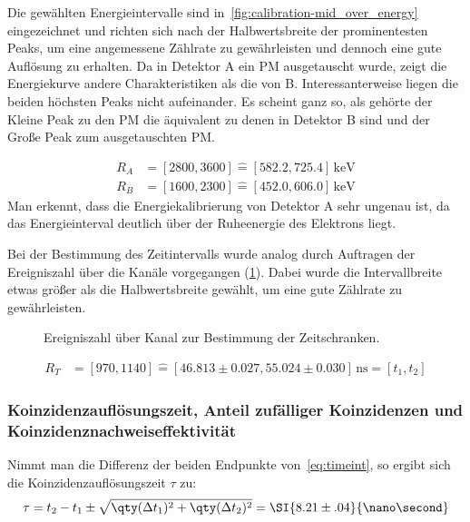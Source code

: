 \documentclass[slug=PET, room=Andreas-Schubert-Bau\,\ 424A, supervisor=Carsten\ Bittrich, coursedate=10.\ 01.\ 2020]{../../Lab_Report_LaTeX/lab_report}
\begin{document}
Die gew\"ahlten Energieintervalle sind
in~\ref{fig:calibration-mid_over_energy} eingezeichnet und richten
sich nach der Halbwertsbreite der prominentesten Peaks, um eine
angemessene Z\"ahlrate zu gew\"ahrleisten und dennoch eine gute
Auflösung zu erhalten. Da in Detektor A ein PM ausgetauscht wurde,
zeigt die Energiekurve andere Charakteristiken als die von
B. Interessanterweise liegen die beiden h\"ochsten Peaks nicht
aufeinander. Es scheint ganz so, als geh\"orte der Kleine Peak zu den
PM die \"aquivalent zu denen in Detektor B sind und der Gro\ss{}e Peak
zum ausgetauschten PM.

\begin{align}
  \label{eq:fenster}
  R_A &= [2800, 3600] \hat{=} [582.2, 725.4]\,\si{\kilo\electronvolt}
  \\
  R_B &= [1600, 2300] \hat{=} [452.0, 606.0]\,\si{\kilo\electronvolt}
\end{align}
Man erkennt, dass die Energiekalibrierung von Detektor A sehr ungenau
ist, da das Energieinterval deutlich \"uber der Ruheenergie des
Elektrons liegt.

Bei der Bestimmung des Zeitintervalls wurde analog durch Auftragen der
Ereigniszahl \"uber die Kan\"ale vorgegangen
(\ref{fig:calibration-time_range}). Dabei wurde die Intervallbreite
etwas gr\"o\ss{}er als die Halbwertsbreite gew\"ahlt, um eine gute
Z\"ahlrate zu gew\"ahrleisten.

\begin{figure}[h]\centering
  
  \caption{Ereigniszahl \"uber Kanal zur Bestimmung der Zeitschranken.}
  \label{fig:calibration-time_range}
\end{figure}

\begin{align}
  \label{eq:timeint}
  R_T &= [970, 1140] \hat{=} [46.813\pm 0.027, 55.024\pm
        0.030]\,\si{\nano\second} = [t_1, t_2]
\end{align}

\subsubsection{Koinzidenzaufl\"osungszeit, Anteil zuf\"alliger Koinzidenzen und Koinzidenznachweiseffektivit\"at}
\label{sec:koaufl}

Nimmt man die Differenz der beiden Endpunkte von~\eqref{eq:timeint}, so
ergibt sich die Koinzidenzaufl\"osungszeit \(\tau\) zu:
\begin{equation}
  \label{eq:koauf}
  \tau = t_2 - t_1 \pm \sqrt{\qty(\Delta t_1)^2 + \qty(\Delta t_2)^2}
  = \SI{8.21\pm .04}{\nano\second}
\end{equation}
\end{document}

